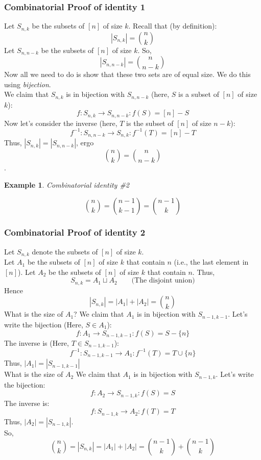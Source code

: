 \documentclass{report}
\newtheorem{ex}{Example}[section]
\begin{document}
\subsubsection{Combinatorial Proof of identity 1}
Let $S_{n,k}$ be the subsets of $[n]$ of size $k$. Recall that (by definition):
$$|S_{n,k}| = {n \choose k}$$
Let $S_{n,n-k}$ be the subsets of $[n]$ of size $k$. So,
$$|S_{n, n-k}| = {n \choose n-k}$$
Now all we need to do is show that these two sets are of equal size. We do this using \textit{bijection}.\\
We claim that $S_{n,k}$ is in bijection with $S_{n, n-k}$ (here, $S$ is a subset of $[n]$ of size $k$):
$$f: S_{n,k} \rightarrow S_{n,n-k}: f(S) = [n] - S$$
Now let's consider the inverse (here, $T$ is the subset of $[n]$ of size $n-k$):
$$f^{-1}:S_{n,n-k} \rightarrow S_{n,k}:f^{-1}(T) = [n]-T$$
Thus, $|S_{n,k}| = |S_{n,n-k}|$, ergo $${n \choose k} = {n \choose n-k}$$.
\begin{ex}
Combinatorial identity \#2
\end{ex}
$${n \choose k} = {n-1 \choose k-1} = {n-1 \choose k}$$
\subsubsection{Combinatorial Proof of identity 2}
Let $S_{n,k}$ denote the subsets of $[n]$ of size $k$.\\Let $A_1$ be the subsets of $[n]$ of size $k$ that contain $n$ (i.e., the last element in $[n]$). Let $A_2$ be the subsets of $[n]$ of size $k$ that contain $n$. Thus,
$$S_{n,k} = A_1 \sqcup A_2 \qquad \text{(The disjoint union)}$$ Hence $$|S_{n,k}| = |A_1| + |A_2| = {n \choose k}$$
What is the size of $A_1$? We claim that $A_1$ is in bijection with $S_{n-1, k-1}$. Let's write the bijection (Here, $S \in A_1$):
$$f: A_1 \rightarrow S_{n-1,k-1} : f(S) = S - \{n\}$$
The inverse is (Here, $T \in S_{n-1,k-1}$):
$$f^{-1}: S_{n-1,k-1} \rightarrow A_1 : f^{-1}(T) = T \cup \{n\}$$
Thus, $|A_1| = |S_{n-1,k-1}|$\\
What is the size of $A_2$ We claim that $A_1$ is in bijection with $S_{n-1,k}$. Let's write the bijection:
$$f: A_2 \rightarrow S_{n-1,k}: f(S) = S$$
The inverse is:
$$f: S_{n-1,k} \rightarrow A_2 :  f(T) = T$$
Thus, $|A_2| = |S_{n-1,k}|$.\\
So,
$${n \choose k} = |S_{n,k}| = |A_1| + |A_2| = {n-1 \choose k} + {n-1 \choose k}$$
\end{document}
